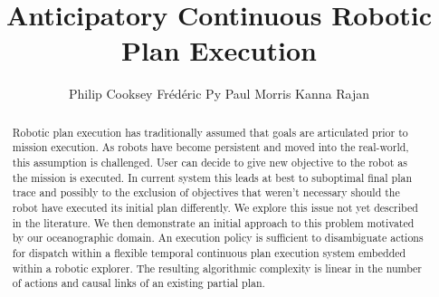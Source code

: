 \documentclass[letterpaper]{article}
\begin{document}
\title{Anticipatory Continuous Robotic Plan Execution}
\author{Philip Cooksey \And Fr\'ed\'eric Py \And Paul Morris \And Kanna Rajan}
\maketitle{}

\begin{abstract}

  Robotic plan execution has traditionally assumed that goals are
  articulated prior to mission execution. As robots have become
  persistent and moved into the real-world, this assumption is
  challenged. User can decide to give new objective to the robot 
  as the mission is executed. In current system this leads at best to
  suboptimal final plan trace and possibly to the exclusion  of
  objectives that weren't necessary should the robot have executed its
  initial plan differently. 
  We explore this issue not yet described in the literature.
  We then demonstrate an initial approach to this
  problem motivated by our oceanographic domain.  An execution policy
  is sufficient to disambiguate actions for dispatch
  within a flexible temporal continuous plan execution system embedded
  within a robotic explorer.  The resulting algorithmic complexity is
  linear in the number of actions and causal links of an existing
  partial plan.

\end{abstract}






 






\twocolumn 


\end{document}
